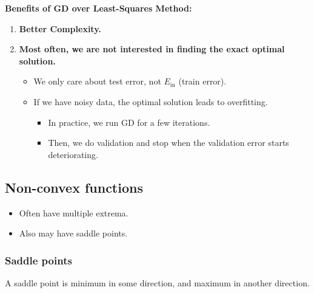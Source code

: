 \begin{intuition}
    \textbf{Benefits of GD over Least-Squares Method:}
    \begin{enumerate}
        \item \textbf{Better Complexity.}
        
        \item \textbf{Most often, we are not interested in finding the exact optimal solution.}
        \begin{itemize}
            \item We only care about test error, not \( E_{\text{in}} \) (train error).
            \item If we have noisy data, the optimal solution leads to overfitting.
            \begin{itemize}
                \item In practice, we run GD for a few iterations.
                \item Then, we do validation and stop when the validation error starts deteriorating.
            \end{itemize}
        \end{itemize}
    \end{enumerate}
\end{intuition}

\subsection{Non-convex functions}
\begin{intuition}
    \begin{itemize}
        \item Often have multiple extrema.
        \item Also may have saddle points.
    \end{itemize}
\end{intuition}

    \subsubsection{Saddle points}
    \begin{definition}
        A saddle point is minimum in some direction, and maximum in another direction. 
    \end{definition}

